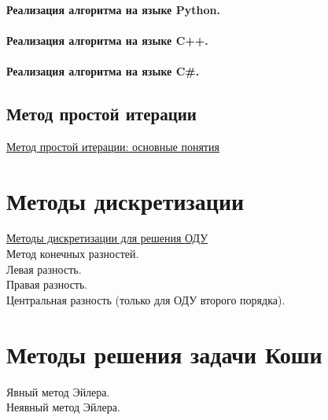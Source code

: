 \documentclass[12pt]{article}
\begin{document}
\paragraph{Реализация алгоритма на языке Python.}

\paragraph{Реализация алгоритма на языке C++.}

\paragraph{Реализация алгоритма на языке C\#.}

\subsection{Метод простой итерации}

\href{https://zaochnik.com/spravochnik/matematika/issledovanie-slau/iteratsionnye-metody-reshenija-slau/}{Метод простой итерации: основные понятия}

\section{Методы дискретизации}

\href{https://studfile.net/preview/5829857/}{Методы дискретизации для решения ОДУ}\\

Метод конечных разностей.\\

Левая разность.\\

Правая разность.\\

Центральная разность (только для ОДУ второго порядка).\\


\section{Методы решения задачи Коши}


Явный метод Эйлера.\\

Неявный метод Эйлера.
\end{document}
